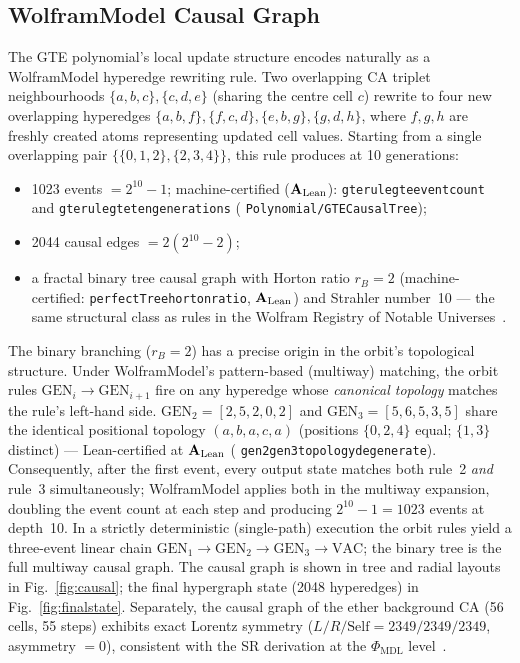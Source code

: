 \documentclass[11pt]{article}
\theoremstyle{remark}
\newcommand{\PHIMDL}{\ensuremath{\Phi_{\mathrm{MDL}}}}
\newcommand{\lean}[1]{%
  \penalty-100
  \begingroup\def\_{\textunderscore\allowbreak}\texttt{#1}\endgroup}
\newcommand{\CatAL}{\texorpdfstring{\ensuremath{\textbf{A}_{\rm Lean}}}{A-Lean}}
\begin{document}
\subsection{WolframModel Causal Graph}

The GTE polynomial's local update structure encodes naturally as a WolframModel
hyperedge rewriting rule.  Two overlapping CA triplet neighbourhoods
$\{a,b,c\},\{c,d,e\}$ (sharing the centre cell $c$) rewrite to four new
overlapping hyperedges $\{a,b,f\},\{f,c,d\},\{e,b,g\},\{g,d,h\}$,
where $f,g,h$ are freshly created atoms representing updated cell values.
Starting from a single overlapping pair $\{\{0,1,2\},\{2,3,4\}\}$,
this rule produces at 10 generations:
\begin{itemize}
  \item 1023 events $= 2^{10} - 1$; machine-certified (\CatAL{}):
        \lean{gte\_rulegte\_event\_count} and \lean{gte\_rulegte\_ten\_generations}
        (\lean{Polynomial/GTECausalTree});
  \item 2044 causal edges $= 2(2^{10}-2)$;
  \item a fractal binary tree causal graph with Horton ratio $r_B = 2$
        (machine-certified: \lean{perfectTree\_horton\_ratio}, \CatAL{})
        and Strahler number~10 --- the same structural class as rules in the
        Wolfram Registry of Notable Universes~\cite{Wolfram2020Tech}.
\end{itemize}
The binary branching ($r_B = 2$) has a precise origin in the orbit's topological
structure.
Under WolframModel's pattern-based (multiway) matching, the orbit rules
$\mathrm{GEN}_i \to \mathrm{GEN}_{i+1}$ fire on any hyperedge whose
\emph{canonical topology} matches the rule's left-hand side.
$\mathrm{GEN}_2 = [2,5,2,0,2]$ and $\mathrm{GEN}_3 = [5,6,5,3,5]$ share
the identical positional topology $(a,b,a,c,a)$ (positions $\{0,2,4\}$ equal;
$\{1,3\}$ distinct) --- Lean-certified at \CatAL{}
(\lean{gen2\_gen3\_topology\_degenerate}).
Consequently, after the first event, every output state matches both rule~2
\emph{and} rule~3 simultaneously; WolframModel applies both in the multiway
expansion, doubling the event count at each step and producing $2^{10}-1 = 1023$
events at depth~10.
In a strictly deterministic (single-path) execution the orbit rules yield a
three-event linear chain $\mathrm{GEN}_1\!\to\!\mathrm{GEN}_2\!\to\!\mathrm{GEN}_3\!\to\!\mathrm{VAC}$;
the binary tree is the full multiway causal graph.
The causal graph is shown in tree and radial layouts in
Fig.~\ref{fig:causal}; the final hypergraph state (2048 hyperedges) in
Fig.~\ref{fig:finalstate}.
Separately, the causal graph of the ether background CA (56 cells, 55 steps)
exhibits exact Lorentz symmetry ($L/R/\mathrm{Self} = 2349/2349/2349$,
asymmetry $= 0$), consistent with the SR derivation at the $\PHIMDL{}$
level~\cite{SpivackCMCA,SpivackThreeTapeCMCA}.
\end{document}
